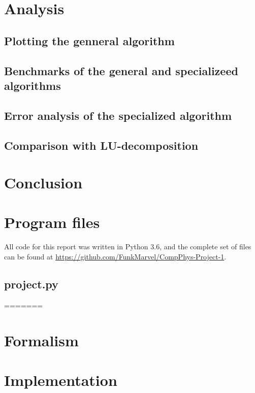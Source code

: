 \documentclass[english,notitlepage]{revtex4-1}  %
\begin{document}
\section{Analysis}\label{sec:4}

\subsection{Plotting the genneral algorithm}\label{subsec:41}

\subsection{Benchmarks of the general and specializeed algorithms}\label{subsec:42}

\subsection{Error analysis of the specialized algorithm}\label{subsec:43}

\subsection{Comparison with LU-decomposition}\label{subsec:43}

\section{Conclusion}\label{sec:5}

\appendix
\section{Program files} \label{A}
All code for this report was written in Python 3.6, and the complete set of files can be found at \url{https://github.com/FunkMarvel/CompPhys-Project-1}.
\subsection{project.py}\label{A:1}
=======

\section{Formalism}\label{sec:2}

\section{Implementation}\label{sec:3}
\end{document}
